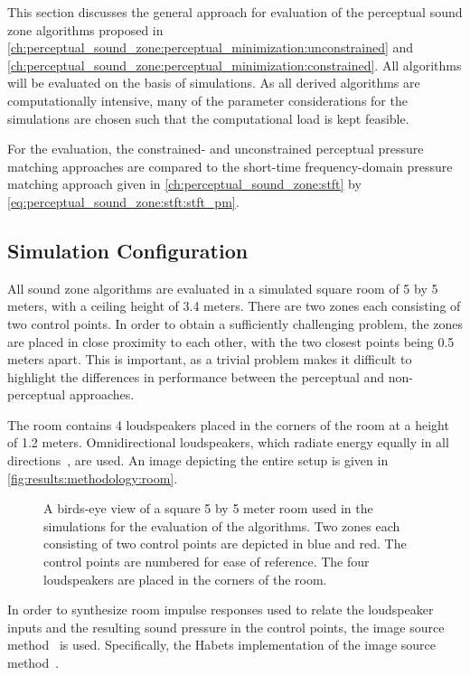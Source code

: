 This section discusses the general approach for evaluation of the perceptual sound zone algorithms proposed in 
\autoref{ch:perceptual_sound_zone:perceptual_minimization:unconstrained} and \autoref{ch:perceptual_sound_zone:perceptual_minimization:constrained}.
All algorithms will be evaluated on the basis of simulations. 
As all derived algorithms are computationally intensive, many of the parameter considerations 
for the simulations are chosen such that the computational load is kept feasible.

For the evaluation, the constrained- and unconstrained perceptual pressure matching approaches are compared to the 
short-time frequency-domain pressure matching approach
given in \autoref{ch:perceptual_sound_zone:stft} by \autoref{eq:perceptual_sound_zone:stft:stft_pm}.

\subsection{Simulation Configuration}
\label{ch:results:methodology:configuration}
All sound zone algorithms are evaluated in a simulated square room of 5 by 5 meters, with a ceiling height of 3.4 meters.
There are two zones each consisting of two control points.
In order to obtain a sufficiently challenging problem, the zones are placed in close proximity to each other, 
with the two closest points being 0.5 meters apart.
This is important, as a trivial problem makes it difficult to highlight the differences in performance
between the perceptual and non-perceptual approaches.

The room contains 4 loudspeakers placed in the corners of the room at a height of 1.2 meters.
Omnidirectional loudspeakers, which radiate energy equally in all directions~\cite{habets2006room}, are used.
An image depicting the entire setup is given in \autoref{fig:results:methodology:room}.

\begin{figure}[]
    \centering
    \scalebox{1.0}{}
    \caption{A birds-eye view of a square 5 by 5 meter room used in the simulations for the evaluation of the algorithms.
    Two zones each consisting of two control points are depicted in blue and red.
    The control points are numbered for ease of reference.
    The four loudspeakers are placed in the corners of the room.}
    \label{fig:results:methodology:room}
\end{figure}

In order to synthesize room impulse responses used to relate the loudspeaker inputs and the resulting sound pressure 
in the control points, the image source method~\cite{allen1979image} is used.
Specifically, the Habets implementation of the image source method~\cite{habets2006room}.

